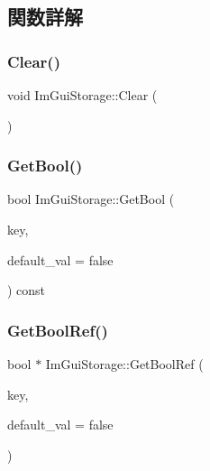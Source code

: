 \subsection{関数詳解}
\mbox{\label{struct_im_gui_storage_a72ceecfbca3d08df8c2a232b77890c20}} 
\subsubsection{\texorpdfstring{Clear()}{Clear()}}
{\footnotesize\ttfamily void Im\+Gui\+Storage\+::\+Clear (\begin{DoxyParamCaption}{ }\end{DoxyParamCaption})}

\mbox{\label{struct_im_gui_storage_a22d34ae6278f86468a3e7df8fbd1b632}} 
\subsubsection{\texorpdfstring{Get\+Bool()}{GetBool()}}
{\footnotesize\ttfamily bool Im\+Gui\+Storage\+::\+Get\+Bool (\begin{DoxyParamCaption}\item[{\mbox{\hyperlink{imgui_8h_a1785c9b6f4e16406764a85f32582236f}{Im\+Gui\+ID}}}]{key,  }\item[{bool}]{default\+\_\+val = {\ttfamily false} }\end{DoxyParamCaption}) const}

\mbox{\label{struct_im_gui_storage_aeb0d62100453d710bac5f6ad0a6e6a2e}} 
\subsubsection{\texorpdfstring{Get\+Bool\+Ref()}{GetBoolRef()}}
{\footnotesize\ttfamily bool $\ast$ Im\+Gui\+Storage\+::\+Get\+Bool\+Ref (\begin{DoxyParamCaption}\item[{\mbox{\hyperlink{imgui_8h_a1785c9b6f4e16406764a85f32582236f}{Im\+Gui\+ID}}}]{key,  }\item[{bool}]{default\+\_\+val = {\ttfamily false} }\end{DoxyParamCaption})}

